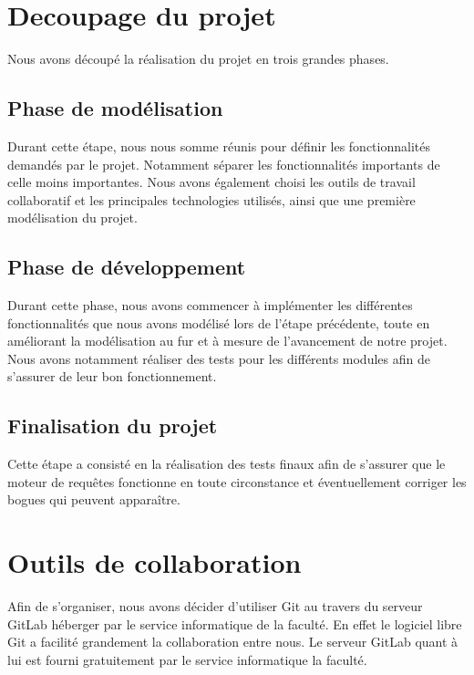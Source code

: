 \documentclass[oneside,13pt,a4paper]{report}
\begin{document}
        \section{Decoupage du projet}

            Nous avons découpé la réalisation du projet en trois grandes phases.

            \subsection{Phase de modélisation}

                Durant cette étape, nous nous somme réunis pour définir les fonctionnalités demandés par le projet. Notamment séparer les fonctionnalités importants de celle moins importantes. Nous avons également choisi les outils de travail collaboratif et les principales technologies utilisés, ainsi que une première modélisation du projet.

            \subsection{Phase de développement}

                Durant cette phase, nous avons commencer à implémenter les différentes fonctionnalités que nous avons modélisé lors de l’étape précédente, toute en améliorant la modélisation au fur et à mesure de l’avancement de notre projet. Nous avons notamment réaliser des tests pour les différents modules afin de s’assurer de leur bon fonctionnement.

            \subsection{Finalisation du projet}

                Cette étape a consisté en la réalisation des tests finaux afin de s’assurer que le moteur de requêtes fonctionne en toute circonstance et éventuellement corriger les bogues qui peuvent apparaître.

        \section{Outils de collaboration}

            Afin de s’organiser, nous avons décider d’utiliser Git au travers du serveur GitLab héberger par le service informatique de la faculté. En effet le logiciel libre Git a facilité grandement la collaboration entre nous. Le serveur GitLab quant à lui est fourni gratuitement par le service informatique la faculté.
\end{document}
